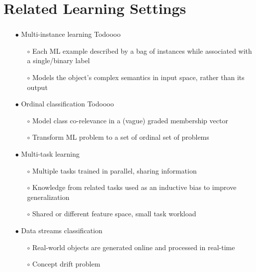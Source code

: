 \documentclass{beamer}
\begin{document}
\section{Related Learning Settings}
\begin{frame}
\frametitle{\insertsection}
\begin{itemize}
\item[$\bullet$] Multi-instance learning Todoooo
\begin{itemize}
\item[$\circ$] Each ML example described by a bag of instances while associated with a single/binary label
\item[$\circ$] Models the object’s complex semantics in input space, rather than its output
\end{itemize}
\item[$\bullet$] Ordinal classification Todoooo
\begin{itemize}
\item[$\circ$] Model class co-relevance in a (vague) graded membership vector
\item[$\circ$] Transform ML problem to a set of ordinal set of problems
\end{itemize}
\item[$\bullet$] Multi-task learning
\begin{itemize}
\item[$\circ$] Multiple tasks trained in parallel, sharing information
\item[$\circ$] Knowledge from related tasks used as an inductive bias to improve generalization
\item[$\circ$] Shared or different feature space, small task workload
\end{itemize}
\item[$\bullet$] Data streams classification
\begin{itemize}
\item[$\circ$] Real-world objects are generated online and processed in  real-time
\item[$\circ$] Concept drift problem
\end{itemize}
\end{itemize}
\end{frame}

\end{document}

